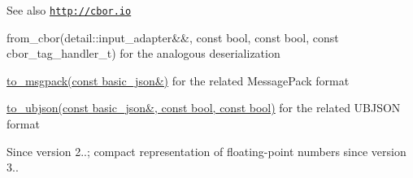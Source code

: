 \begin{DoxySeeAlso}{See also}
\href{http://cbor.io}{\tt http\+://cbor.\+io} 

from\+\_\+cbor(detail\+::input\+\_\+adapter\&\&, const bool, const bool, const cbor\+\_\+tag\+\_\+handler\+\_\+t) for the analogous deserialization 

\hyperlink{classnlohmann_1_1basic__json_a99b15bcaee410426b937eacc6e47d771}{to\+\_\+msgpack(const basic\+\_\+json\&)} for the related Message\+Pack format 

\hyperlink{classnlohmann_1_1basic__json_a25355b9719db23b189fb5f6a8f4f16c4}{to\+\_\+ubjson(const basic\+\_\+json\&, const bool, const bool)} for the related U\+B\+J\+S\+ON format
\end{DoxySeeAlso}
\begin{DoxySince}{Since}
version 2..; compact representation of floating-\/point numbers since version 3.. 
\end{DoxySince}
